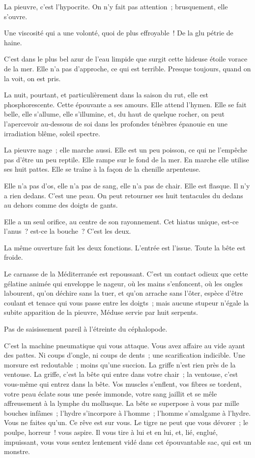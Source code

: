 \documentclass[french,twoside]{book} %
\begin{document}
La pieuvre, c’est l’hypocrite. On n’y fait pas attention ; brusquement, elle s’ouvre.\par
Une viscosité qui a une volonté, quoi de plus effroyable ! De la glu pétrie de haine.\par
C’est dans le plus bel azur de l’eau limpide que surgit cette hideuse étoile vorace de la mer. Elle n’a pas d’approche, ce qui est terrible. Presque toujours, quand on la voit, on est pris.\par
La nuit, pourtant, et particulièrement dans la saison du rut, elle est phosphorescente. Cette épouvante a ses amours. Elle attend l’hymen. Elle se fait belle, elle s’allume, elle s’illumine, et, du haut de quelque rocher, on peut l’apercevoir au-dessous de soi dans les profondes ténèbres épanouie en une irradiation blême, soleil spectre.\par
La pieuvre nage ; elle marche aussi. Elle est un peu poisson, ce qui ne l’empêche pas d’être un peu reptile. Elle rampe sur le fond de la mer. En marche elle utilise ses huit pattes. Elle se traîne à la façon de la chenille arpenteuse.\par
Elle n’a pas d’os, elle n’a pas de sang, elle n’a pas de chair. Elle est flasque. Il n’y a rien dedans. C’est une peau. On peut retourner ses huit tentacules du dedans au dehors comme des doigts de gants.\par
Elle a un seul orifice, au centre de son rayonnement. Cet hiatus unique, est-ce l’anus ? est-ce la bouche ? C’est les deux.\par
 La même ouverture fait les deux fonctions. L’entrée est l’issue. Toute la bête est froide.\par
Le carnasse de la Méditerranée est repoussant. C’est un contact odieux que cette gélatine animée qui enveloppe le nageur, où les mains s’enfoncent, où les ongles labourent, qu’on déchire sans la tuer, et qu’on arrache sans l’ôter, espèce d’être coulant et tenace qui vous passe entre les doigts ; mais aucune stupeur n’égale la subite apparition de la pieuvre, Méduse servie par huit serpents.\par
Pas de saisissement pareil à l’étreinte du céphalopode.\par
C’est la machine pneumatique qui vous attaque. Vous avez affaire au vide ayant des pattes. Ni coups d’ongle, ni coups de dents ; une scarification indicible. Une morsure est redoutable ; moins qu’une succion. La griffe n’est rien près de la ventouse. La griffe, c’est la bête qui entre dans votre chair ; la ventouse, c’est vous-même qui entrez dans la bête. Vos muscles s’enflent, vos fibres se tordent, votre peau éclate sous une pesée immonde, votre sang jaillit et se mêle affreusement à la lymphe du mollusque. La bête se superpose à vous par mille bouches infâmes ; l’hydre s’incorpore à l’homme ; l’homme s’amalgame à l’hydre. Vous ne faites qu’un. Ce rêve est sur vous. Le tigre ne peut que vous dévorer ; le poulpe, horreur ! vous aspire. Il vous tire à lui et en lui, et, lié, englué, impuissant, vous vous sentez lentement vidé dans cet épouvantable sac, qui est un monstre.\par
\end{document}
